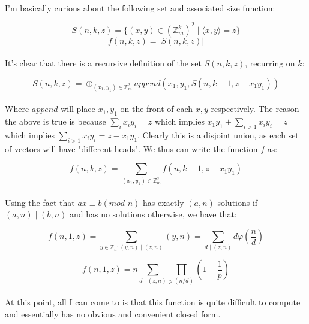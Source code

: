 \documentclass{article}
\begin{document}
\paragraph*{}
  I'm basically curious about the following set and associated size function:

\[S(n, k, z) = \{ (x, y) \in (\mathbb{Z}_m^k)^2 \mid \langle x, y \rangle = z \} \] 
\[f(n, k, z) = |S(n, k, z)| \]

\paragraph*{}
  It's clear that there is a recursive definition of the set $S(n, k, z)$, recurring
  on $k$:

\[ S(n, k, z) = \oplus_{(x_1, y_1) \in \mathbb{Z}_m^2} append(x_1, y_1, S(n, k - 1, z - x_1y_1)) \]

\paragraph*{}
  Where $append$ will place $x_1, y_1$ on the front of each $x, y$ respectively. The reason
  the above is true is because $\sum_i x_i y_i = z$ which implies $x_1 y_1 + \sum_{i>1} x_i y_i = z$
  which implies $\sum_{i>1}x_iy_i = z - x_1y_1$. Clearly this is a disjoint union, as each
  set of vectors will have "different heads". We thus can write the function $f$ as:

\[ f(n, k, z) = \sum_{(x_1, y_1) \in \mathbb{Z}_m^2} f(n, k - 1, z - x_1y_1) \]

\paragraph*{}
  Using the fact that $ax \equiv b (\textit{mod } n)$ has exactly $(a, n)$ solutions if $(a, n) \mid
  (b, n)$ and has no solutions otherwise, we have that:

\[ f(n, 1, z) = \sum_{y \in \mathbb{Z}_n : (y, n) \mid (z, n)} (y, n) = \sum_{d \mid (z, n)} d \varphi(\frac{n}{d}) \]

\[ f(n, 1, z) = n \sum_{d \mid (z, n)} \prod_{p | (n / d)} (1 - \frac{1}{p}) \]

\paragraph*{}
  At this point, all I can come to is that this function is quite difficult to compute and
  essentially has no obvious and convenient closed form.
\end{document}
